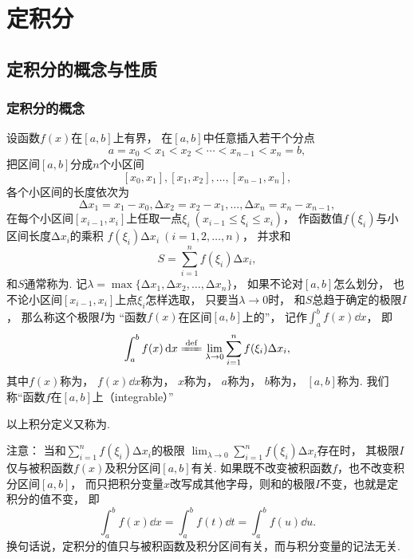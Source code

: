 \chapter{定积分}
\section{定积分的概念与性质}
\subsection{定积分的概念}
\begin{definition}
设函数\(f(x)\)在\([a,b]\)上有界，
在\([a,b]\)中任意插入若干个分点\[
	a=x_0 < x_1 < x_2 < \dotsb < x_{n-1} < x_n = b,
\]
把区间\([a,b]\)分成\(n\)个小区间\[
	[x_0,x_1],[x_1,x_2],\dotsc,[x_{n-1},x_n],
\]
各个小区间的长度依次为\[
	\increment x_1=x_1-x_0,
	\increment x_2=x_2-x_1,
	\dotsc,
	\increment x_n=x_n-x_{n-1},
\]
在每个小区间\([x_{i-1},x_i]\)上任取一点\(\xi_i\ (x_{i-1} \leq \xi_i \leq x_i)\)，
作函数值\(f(\xi_i)\)与小区间长度\(\increment x_i\)的乘积
\(f(\xi_i)\increment x_i\ (i=1,2,\dotsc,n)\)，
并求和\[
	S = \sum_{i=1}^n f(\xi_i) \increment x_i,
\]
和\(S\)通常称为.
记\(\lambda=\max\{\increment x_1,\increment x_2,\dotsc,\increment x_n\}\)，
如果不论对\([a,b]\)怎么划分，
也不论小区间\([x_{i-1},x_i]\)上点\(\xi_i\)怎样选取，
只要当\(\lambda\to0\)时，
和\(S\)总趋于确定的极限\(I\)，
那么称这个极限\(I\)为
“函数\(f(x)\)在区间\([a,b]\)上的”，
记作\(\int_a^b f(x) \dd{x}\)，
即\begin{equation}
	\int_a^b f(x) \dd{x}
	\defeq
	\lim_{\lambda\to0} \sum_{i=1}^n f(\xi_i)\increment x_i,
\end{equation}
其中\(f(x)\)称为，
\(f(x)\dd{x}\)称为，
\(x\)称为，
\(a\)称为，
\(b\)称为，
\([a,b]\)称为.
我们称“函数\(f\)在\([a,b]\)上（integrable）”
\end{definition}
以上积分定义又称为.

注意：
当和\(\sum_{i=1}^n f(\xi_i) \increment x_i\)的极限
\(\lim_{\lambda\to0} \sum_{i=1}^n f(\xi_i) \increment x_i\)存在时，
其极限\(I\)仅与被积函数\(f(x)\)及积分区间\([a,b]\)有关.
如果既不改变被积函数\(f\)，也不改变积分区间\([a,b]\)，
而只把积分变量\(x\)改写成其他字母，则和的极限\(I\)不变，也就是定积分的值不变，
即\[
	\int_a^b f(x) \dd{x}
	= \int_a^b f(t) \dd{t}
	= \int_a^b f(u) \dd{u}.
\]
换句话说，定积分的值只与被积函数及积分区间有关，而与积分变量的记法无关.

